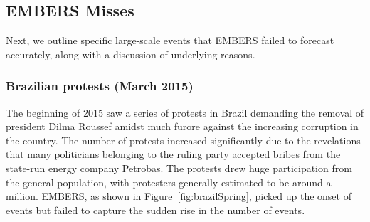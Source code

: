 


\vspace{1em}
\subsection{EMBERS Misses}
Next, we outline specific large-scale events that
EMBERS failed to forecast accurately, along with a discussion of underlying
reasons.

\subsubsection{Brazilian protests (March 2015)}
The beginning of 2015 saw a series of protests in Brazil demanding the
removal of president Dilma Roussef amidst much furore against the increasing corruption in the country.
The number of protests
increased significantly due to the revelations that many politicians belonging
to the ruling party accepted bribes from the state-run energy company Petrobas. The protests drew huge participation from
the general population, with protesters generally estimated to be around a
million. EMBERS, as shown in Figure~\ref{fig:brazilSpring},
picked up the onset of events but failed to capture the sudden rise 
in the number of events.

